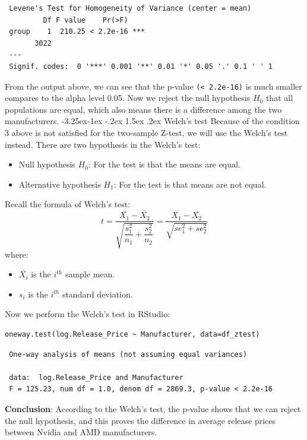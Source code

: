 \documentclass[a4paper]{article}
\makeatletter
\newcounter {subsubsubsection}[subsubsection]
\newcommand\subsubsubsection{\@startsection{subsubsubsection}{4}{\z@}%
                                     {-3.25ex\@plus -1ex \@minus -.2ex}%
                                     {1.5ex \@plus .2ex}%
                                     {\normalfont\normalsize\bfseries}}
\makeatother
\begin{document}
\begin{lstlisting}
 Levene's Test for Homogeneity of Variance (center = mean)
         Df F value    Pr(>F)    
 group    1  210.25 < 2.2e-16 ***
       3022                      
 ---
 Signif. codes:  0 '***' 0.001 '**' 0.01 '*' 0.05 '.' 0.1 ' ' 1
\end{lstlisting}
From the output above, we can see that the p-value \verb|(< 2.2e-16)| is much smaller compares to the alpha level 0.05. Now we reject the null hypothesis $H_0$ that all populations are equal, which also means there is a difference among the two manufacturers.
\subsubsubsection{Welch’s test}
Because of the condition 3 above is not satisfied for the two-sample Z-test, we will use the Welch’s test instead. There are two hypothesis in the Welch’s test:

\begin{itemize}
    \item Null hypothesis $H_0$: For the test is that the means are equal.
    \item Alternative hypothesis $H_1$: For the test is that means are not equal.
\end{itemize}
Recall the formula of Welch’s test:
\begin{equation*}
    t = \dfrac{\overline{X_1}-\overline{X_2}}{\sqrt{\dfrac{s^2_1}{n_1}+\dfrac{s^2_2}{n_2}}}=\dfrac{\overline{X_1}-\overline{X_2}}{\sqrt{se^2_1+se^2_2}}
\end{equation*}
where:
\begin{itemize}
    \item $\overline{X_i}$ is the $i^{th}$ sample mean.
    \item $s_i$ is the $i^{th}$ standard deviation.
\end{itemize}
Now we perform the Welch’s test in RStudio:
\begin{mdframed}[leftline=false,rightline=false,backgroundcolor=lightblue!10,nobreak=false]
    \begin{verbatim}
oneway.test(log.Release_Price ~ Manufacturer, data=df_ztest)
    \end{verbatim}
\end{mdframed}
\begin{lstlisting}
 One-way analysis of means (not assuming equal variances)

 data:  log.Release_Price and Manufacturer
 F = 125.23, num df = 1.0, denom df = 2869.3, p-value < 2.2e-16
\end{lstlisting}
\bigskip
\textbf{Conclusion}:
According to the Welch’s test, the p-value shows that we can reject the null hypothesis, and this proves the difference in average release prices between Nvidia and AMD manufacturers.\\
\end{document}

